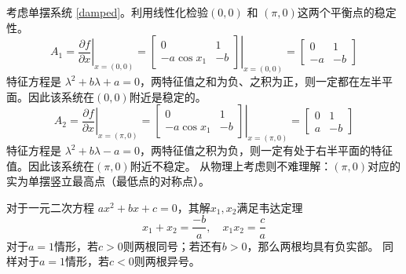   \begin{example}[通过平衡点附近的线性化判别单摆系统的稳定性]
   考虑单摆系统 \eqref{damped}。利用线性化检验$(0, 0)$ 和 $(\pi, 0)$这两个平衡点的稳定性。
    \[ A_1 = \left. \frac{\partial f}{\partial x} \right|_{x = (0, 0)} = \left.
       \left[\begin{array}{cc}
         0 & 1\\
         -a\ensuremath{\operatorname{cos}}  x_1 & - b
       \end{array}\right] \right|_{x = (0, 0)} = \left[\begin{array}{cc}
         0 & 1\\
         - a & - b
       \end{array}\right] \]
    特征方程是 $\lambda^2 + b \lambda + a = 0$，两特征值之和为负、之积为正，则一定都在左半平面。因此该系统在$(0, 0)$附近是稳定的。
    \[ A_2 = \left. \frac{\partial f}{\partial x} \right|_{x = (\pi, 0)} =
       \left. \left[\begin{array}{cc}
         0 & 1\\
         -a\ensuremath{\operatorname{cos}}  x_1 & - b
       \end{array}\right] \right|_{x = (\pi, 0)} = \left[\begin{array}{cc}
         0 & 1\\
         a & - b
       \end{array}\right] \]
       特征方程是 $\lambda^2 + b \lambda - a = 0$，两特征值之积为负，则一定有处于右半平面的特征值。因此该系统在$(\pi, 0)$附近不稳定。
      从物理上考虑则不难理解：$(\pi, 0)$对应的实为单摆竖立最高点（最低点的对称点）。
    \begin{note}
      对于一元二次方程 $a  x^2 + b  x + c = 0$，其解$x_{1},x_{2}$满足韦达定理
      \[ x_1 + x_2 = \frac{- b}{a}, \quad x_1  x_2 = \frac{c}{a} \]
      对于$a = 1$情形，若$c > 0$则两根同号；若还有$b>0$，那么两根均具有负实部。
      同样对于$a = 1$情形，若$c < 0$则两根异号。
    \end{note}
  \end{example}